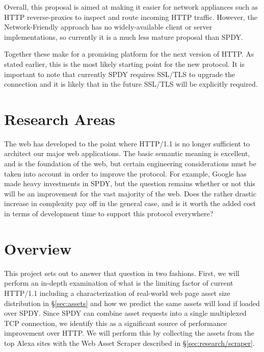 \documentclass[10pt,letterpaper,notitlepage]{article}
\begin{document}
Overall, this proposal is aimed at making it easier for network appliances such
as HTTP reverse-proxies to inspect and route incoming HTTP traffic. However,
the Network-Friendly approach has no widely-available client or server
implementations, so currently it is a much less mature proposal than SPDY.

Together these make for a promising platform for the next version of HTTP.  As
stated earlier, this is the most likely starting point for the new protocol. It
is important to note that currently SPDY requires SSL/TLS to upgrade the
connection and it is likely that in the future SSL/TLS will be explicitly
required.

\section{Research Areas}
\label{sec:research}
The web has developed to the point where HTTP/1.1 is no longer sufficient to
architect our major web applications. The basic semantic meaning is excellent,
and is the foundation of the web, but certain engineering considerations must
be taken into account in order to improve the protocol. For example, Google has
made heavy investments in SPDY, but the question remains whether or not this
will be an improvement for the vast majority of the web.  Does the rather
drastic increase in complexity pay off in the general case, and is it worth the
added cost in terms of development time to support this protocol everywhere?

\section{Overview}
\label{sec:research/overview}
This project sets out to answer that question in two fashions. First, we will
perform an in-depth examination of what is the limiting factor of current
HTTP/1.1 including a characterization of real-world web page asset size
distribution in \S\ref{sec:assets} and how we predict the same assets will load
if loaded over SPDY. Since SPDY can combine asset requests into a single
multiplexed TCP connection, we identify this as a significant source of
performance improvement over HTTP. We will perform this by collecting the
assets from the top Alexa sites with the Web Asset Scraper described in
\S\ref{sec:research/scraper}.
\end{document}
